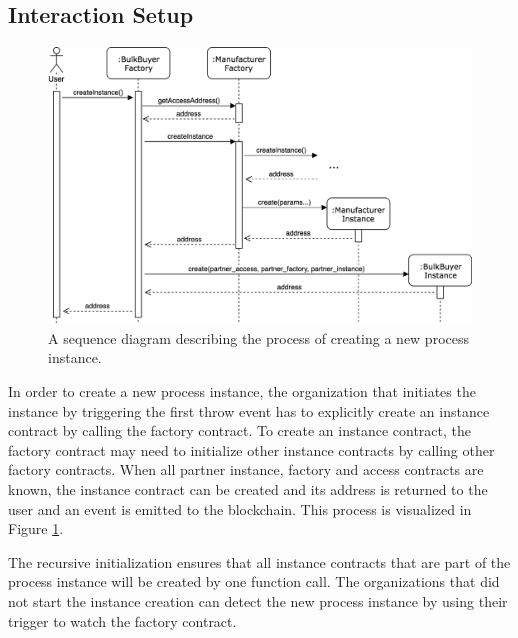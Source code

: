 \documentclass[runningheads]{llncs}
\begin{document}
\subsection{Interaction Setup}
\begin{figure}
	\centering
	\includegraphics[width=\textwidth]{fig/instance_creation.eps}
	\caption{A sequence diagram describing the process of creating a new process instance.}
	\label{fig:instance_creation}
\end{figure}

In order to create a new process instance, the organization that initiates the instance by triggering the first throw event has to explicitly create an instance contract by calling the factory contract.
To create an instance contract, the factory contract may need to initialize other instance contracts by calling other factory contracts.
When all partner instance, factory and access contracts are known, the instance contract can be created and its address is returned to the user and an event is emitted to the blockchain.
This process is visualized in Figure \ref{fig:instance_creation}.

The recursive initialization ensures that all instance contracts that are part of the process instance will be created by one function call.
The organizations that did not start the instance creation can detect the new process instance by using their trigger to watch the factory contract.
\end{document}
